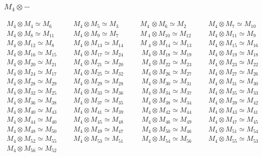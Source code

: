\subsubsection{$M_4\otimes -$}
\begin{align*}
M_{4} \otimes M_{4} \simeq M_{6} &&& M_{4} \otimes M_{5} \simeq M_{3} &&& M_{4\
} \otimes M_{6} \simeq M_{2} &&& M_{4} \otimes M_{7} \simeq M_{10}\\
M_{4} \otimes M_{8} \simeq M_{11} &&& M_{4} \otimes M_{9} \simeq M_{7} &&& M_{\
4} \otimes M_{10} \simeq M_{12} &&& M_{4} \otimes M_{11} \simeq M_{9}\\
M_{4} \otimes M_{12} \simeq M_{8} &&& M_{4} \otimes M_{13} \simeq M_{14} &&& M\
_{4} \otimes M_{14} \simeq M_{13} &&& M_{4} \otimes M_{15} \simeq M_{16}\\
M_{4} \otimes M_{16} \simeq M_{15} &&& M_{4} \otimes M_{17} \simeq M_{24} &&& \
M_{4} \otimes M_{18} \simeq M_{19} &&& M_{4} \otimes M_{19} \simeq M_{18}\\
M_{4} \otimes M_{20} \simeq M_{21} &&& M_{4} \otimes M_{21} \simeq M_{20} &&& \
M_{4} \otimes M_{22} \simeq M_{23} &&& M_{4} \otimes M_{23} \simeq M_{22}\\
M_{4} \otimes M_{24} \simeq M_{17} &&& M_{4} \otimes M_{25} \simeq M_{32} &&& \
M_{4} \otimes M_{26} \simeq M_{27} &&& M_{4} \otimes M_{27} \simeq M_{26}\\
M_{4} \otimes M_{28} \simeq M_{29} &&& M_{4} \otimes M_{29} \simeq M_{28} &&& \
M_{4} \otimes M_{30} \simeq M_{31} &&& M_{4} \otimes M_{31} \simeq M_{30}\\
M_{4} \otimes M_{32} \simeq M_{25} &&& M_{4} \otimes M_{33} \simeq M_{36} &&& \
M_{4} \otimes M_{34} \simeq M_{37} &&& M_{4} \otimes M_{35} \simeq M_{33}\\
M_{4} \otimes M_{36} \simeq M_{38} &&& M_{4} \otimes M_{37} \simeq M_{35} &&& \
M_{4} \otimes M_{38} \simeq M_{34} &&& M_{4} \otimes M_{39} \simeq M_{42}\\
M_{4} \otimes M_{40} \simeq M_{43} &&& M_{4} \otimes M_{41} \simeq M_{39} &&& \
M_{4} \otimes M_{42} \simeq M_{44} &&& M_{4} \otimes M_{43} \simeq M_{41}\\
M_{4} \otimes M_{44} \simeq M_{40} &&& M_{4} \otimes M_{45} \simeq M_{48} &&& \
M_{4} \otimes M_{46} \simeq M_{49} &&& M_{4} \otimes M_{47} \simeq M_{45}\\
M_{4} \otimes M_{48} \simeq M_{50} &&& M_{4} \otimes M_{49} \simeq M_{47} &&& \
M_{4} \otimes M_{50} \simeq M_{46} &&& M_{4} \otimes M_{51} \simeq M_{54}\\
M_{4} \otimes M_{52} \simeq M_{55} &&& M_{4} \otimes M_{53} \simeq M_{51} &&& \
M_{4} \otimes M_{54} \simeq M_{56} &&& M_{4} \otimes M_{55} \simeq M_{53}\\
M_{4} \otimes M_{56} \simeq M_{52}\\
\end{align*}

